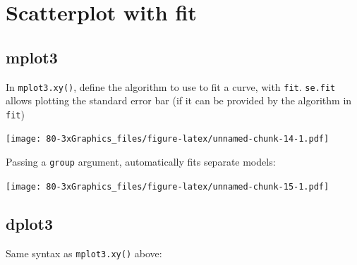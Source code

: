 \documentclass[
]{book}
\newenvironment{Shaded}{\begin{snugshade}}{\end{snugshade}}
\newcommand{\AttributeTok}[1]{\textcolor[rgb]{0.77,0.63,0.00}{#1}}
\newcommand{\FunctionTok}[1]{\textcolor[rgb]{0.00,0.00,0.00}{#1}}
\newcommand{\NormalTok}[1]{#1}
\newcommand{\SpecialCharTok}[1]{\textcolor[rgb]{0.00,0.00,0.00}{#1}}
\newcommand{\StringTok}[1]{\textcolor[rgb]{0.31,0.60,0.02}{#1}}
\begin{document}
\hypertarget{scatterplot-with-fit}{%
\section{Scatterplot with fit}\label{scatterplot-with-fit}}

\hypertarget{mplot3-1}{%
\subsection{\texorpdfstring{\textbf{mplot3}}{mplot3}}\label{mplot3-1}}

In \texttt{mplot3.xy()}, define the algorithm to use to fit a curve, with \texttt{fit}. \texttt{se.fit} allows plotting the standard error bar (if it can be provided by the algorithm in \texttt{fit})

\begin{Shaded}
\end{Shaded}

\texttt{[image: 80-3xGraphics\_files/figure-latex/unnamed-chunk-14-1.pdf]}

Passing a \texttt{group} argument, automatically fits separate models:

\begin{Shaded}
\end{Shaded}

\texttt{[image: 80-3xGraphics\_files/figure-latex/unnamed-chunk-15-1.pdf]}

\hypertarget{dplot3-1}{%
\subsection{\texorpdfstring{\textbf{dplot3}}{dplot3}}\label{dplot3-1}}

Same syntax as \texttt{mplot3.xy()} above:
\end{document}

